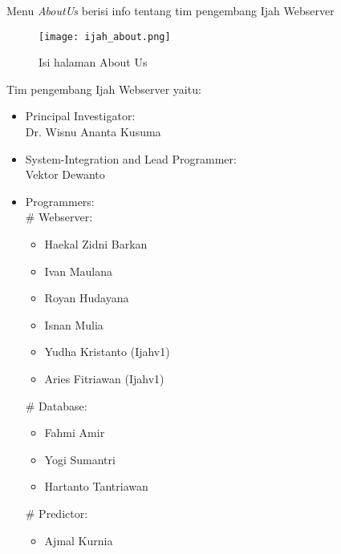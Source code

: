 Menu \emph{AboutUs} berisi info tentang tim pengembang Ijah Webserver

\begin{figure}[H]
	\centering
	\texttt{[image: ijah\_about.png]}
	\caption{Isi halaman About Us}
	\label{fig:ijah_about}
\end{figure}

Tim pengembang Ijah Webserver yaitu:

\begin{itemize}
\item Principal Investigator:\\ 
Dr. Wisnu Ananta Kusuma

\item System-Integration and Lead Programmer:\\
Vektor Dewanto

\item Programmers:\\
\# Webserver:
\begin{itemize}
\item Haekal Zidni Barkan
\item Ivan Maulana
\item Royan Hudayana
\item Isnan Mulia
\item Yudha Kristanto (Ijahv1)
\item Aries Fitriawan (Ijahv1)
\end{itemize}
\# Database:
\begin{itemize}
\item Fahmi Amir
\item Yogi Sumantri
\item Hartanto Tantriawan
\end{itemize}
\# Predictor:
\begin{itemize}
\item Ajmal Kurnia
\end{itemize}
\end{itemize}




